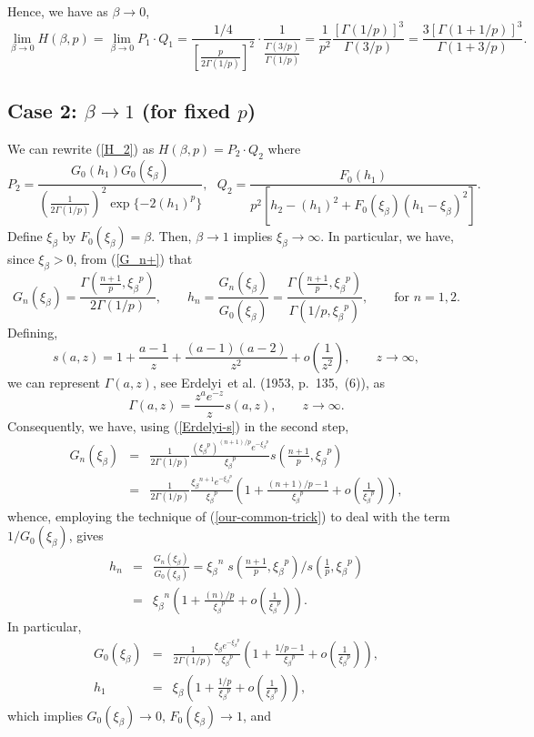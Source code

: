\documentclass[11pt]{article}
\newcommand{\be}{\begin{equation}}
\newcommand{\ee}{\end{equation}}
\newcommand{\ba}{\begin{eqnarray}}
\newcommand{\ea}{\end{eqnarray}}
\newcommand{\bas}{\begin{eqnarray*}}
\newcommand{\eas}{\end{eqnarray*}}
\newcommand{\etal}{et al.}
\newcommand{\B}{\ensuremath{\xi_{\beta}}}
\begin{document}
\noindent Hence, we have as $\beta \rightarrow 0$,
\be \label{L_1}
\lim_{\beta \rightarrow 0} H(\beta,p) = \lim_{\beta \rightarrow 0} P_1 \cdot Q_1 = \frac{1/4}{\left[\frac{p}{2\Gamma(1/p)}\right]^2}\cdot \frac{1}{\frac{\Gamma(3/p)}{\Gamma(1/p)}} = \frac{1}{p^2} \frac{[\Gamma(1/p)]^3}{\Gamma(3/p)} = \frac{3[\Gamma(1+1/p)]^3}{\Gamma(1+3/p)}.
\ee

\subsection*{Case 2: $\beta \rightarrow 1$ (for fixed $p$) }
We can rewrite (\ref{H_2}) as $H(\beta,p) = P_2 \cdot Q_2$ where
\[
P_2 = \frac{G_0(h_1)G_0(\B)} {\left(\frac{1}{2\Gamma(1/p)}\right)^2\exp\{-2\left(h_1\right)^p\}}, \ \ \  
Q_2 = \frac{F_0(h_1)}{p^2[h_2 -\left(h_1\right)^2 + F_0(\B)\left(h_1 -\B \right)^2]}.
\]
Define $\B$ by $F_0(\B) = \beta$.  Then, $\beta \rightarrow 1$ implies $\B \rightarrow \infty$. In particular, we have, since $\B > 0$, from (\ref{G_n+}) that
\[
G_n(\B) = \frac{\Gamma(\frac{n+1}{p},\B^p)}{2\Gamma(1/p)} 
, \qquad h_n = \frac{G_n(\B)}{G_0(\B)} =
\frac{\Gamma(\frac{n+1}{p},\B^p)}{\Gamma(1/p,\B^p)}, \qquad\text{for }n = 1,2.
\]
Defining, 
\be\label{Erdelyi-s}
s(a,z) = 1 + \frac{a -1}{z} + \frac{(a-1)(a-2)}{z^2} + o\left(\frac{1}{z^2}\right),\qquad z \rightarrow \infty,
\ee
we can represent $\Gamma(a,z)$, see Erdelyi~\etal{} (1953, p.~135,~(6)), as
\be
\Gamma(a,z) = \frac{z^a e^{-z}}{z}s(a,z), \qquad z \rightarrow \infty.
\ee
Consequently, we have, using (\ref{Erdelyi-s}) in the second step,
\bas 
G_n(\B) &=& \frac{1}{2\Gamma(1/p)}\frac{(\B^p)^{(n+1)/p}e^{-\B^p}}{\B^p} s\left(\frac{n+1}{p},\B^p\right)  \\
 &=& \frac{1}{2\Gamma(1/p)}\frac{ \B^{n+1} e^{-\B^p}}{\B^p} \left(1 + \frac{(n+1)/p-1}{\B^p}  + o\left(\frac{1}{\B^{p}}\right) \right),
\eas
whence, employing the technique of (\ref{our-common-trick}) to deal
with the term $1/G_0(\B)$, gives
\ba
h_n &=& \frac{G_n(\B)}{G_0(\B)}=
\B^{n}\;s\left(\frac{n+1}{p},\B^p\right)\bigg/ s\left(\frac{1}{p},\B^p\right) \label{my.star.eqn}\\
&=&\B^{n} \left(1 + \frac{(n)/p}{\B^p} +  o\left(\frac{1}{\B^{p}}\right) \right).\nonumber
\ea
In particular, 
\bas
G_0(\B) &=& \frac{1}{2\Gamma(1/p)}\frac{\B e^{-\B^p}}{\B^p} \left(1 + \frac{1/p-1}{\B^p} +  o\left(\frac{1}{\B^{p}}\right) \right), \\
h_1 &=& \B \left(1 + \frac{1/p}{\B^p} +  o\left(\frac{1}{\B^{p}}\right) \right), 
\eas
which implies $G_0(\B) \rightarrow 0$, $F_0(\B) \rightarrow 1$, and
\end{document}
